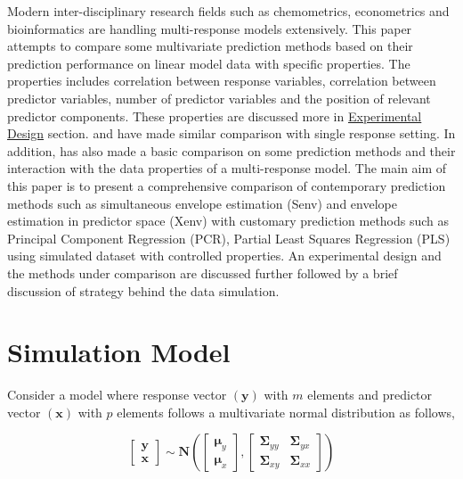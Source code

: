 \documentclass[12pt,3p,authoryear]{elsarticle}
\theoremstyle{definition}
\theoremstyle{definition}
\theoremstyle{definition}
\theoremstyle{remark}
\begin{document}
Modern inter-disciplinary research fields such as chemometrics,
econometrics and bioinformatics are handling multi-response models
extensively. This paper attempts to compare some multivariate prediction
methods based on their prediction performance on linear model data with
specific properties. The properties includes correlation between
response variables, correlation between predictor variables, number of
predictor variables and the position of relevant predictor components.
These properties are discussed more in
\protect\hyperlink{experimental-design}{Experimental Design} section.
\citet{saebo2015simrel} and \citet{Alm_y_1996} have made similar
comparison with single response setting. In addition, \citet{Rimal2018}
has also made a basic comparison on some prediction methods and their
interaction with the data properties of a multi-response model. The main
aim of this paper is to present a comprehensive comparison of
contemporary prediction methods such as simultaneous envelope estimation
(Senv) \citep{cook2015simultaneous} and envelope estimation in predictor
space (Xenv) \citep{cook2010envelope} with customary prediction methods
such as Principal Component Regression (PCR), Partial Least Squares
Regression (PLS) using simulated dataset with controlled properties. An
experimental design and the methods under comparison are discussed
further followed by a brief discussion of strategy behind the data
simulation.

\section{Simulation Model}\label{simulation-model}

Consider a model where response vector \((\mathbf{y})\) with \(m\)
elements and predictor vector \((\mathbf{x})\) with \(p\) elements
follows a multivariate normal distribution as follows,

\begin{equation}
  \begin{bmatrix}
    \mathbf{y} \\ \mathbf{x}
  \end{bmatrix} \sim \mathbf{N}
  \left(
    \begin{bmatrix}
      \boldsymbol{\mu}_y \\
      \boldsymbol{\mu}_x
    \end{bmatrix},
    \begin{bmatrix}
    \boldsymbol{\Sigma}_{yy} & \boldsymbol{\Sigma}_{yx} \\
    \boldsymbol{\Sigma}_{xy} & \boldsymbol{\Sigma}_{xx}
    \end{bmatrix}
  \right)
  \label{eq:model-1}
\end{equation}
\end{document}

